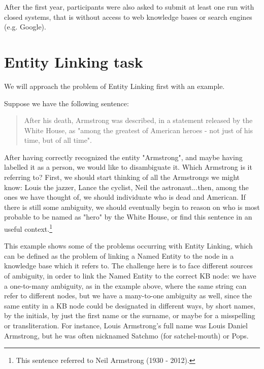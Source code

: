 \documentclass[a4paper,11pt]{report}
\begin{document}
After the first year, participants were also asked to submit at least one run with closed systems, that is without access to web knowledge bases or search engines (e.g. Google).

\section{Entity Linking task}
We will approach the problem of Entity Linking first with an example.

Suppose we have the following sentence:
\begin{quote}
After his death, Armstrong was described, in a statement released by the White House, as "among the greatest of American heroes - not just of his time, but of all time".
\end{quote}

After having correctly recognized the entity "Armstrong", and maybe having labelled it as a person, we would like to disambiguate it. Which Armstrong is it referring to? First, we should start thinking of all the Armstrongs we might know: Louis the jazzer, Lance the cyclist, Neil the astronaut...then, among the ones we have thought of, we should individuate who is dead and American. If there is still some ambiguity, we should eventually begin to reason on who is most probable to be named as "hero" by the White House, or find this sentence in an useful context.\footnote{This sentence referred to Neil Armstrong (1930 - 2012).}

This example shows some of the problems occurring with Entity Linking, which can be defined as the problem of linking a Named Entity to the node in a knowledge base which it refers to. The challenge here is to face different sources of ambiguity, in order to link the Named Entity to the correct KB node: we have a one-to-many ambiguity, as in the example above, where the same string can refer to different nodes, but we have a many-to-one ambiguity as well, since the same entity in a KB node could be designated in different ways, by short names, by the initials, by just the first name or the surname, or maybe for a misspelling or transliteration. For instance, Louis Armstrong's full name was Louis Daniel Armstrong, but he was often nicknamed Satchmo (for satchel-mouth) or Pops.
\end{document}
